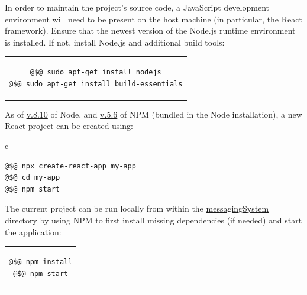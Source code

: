 \documentclass[11pt]{article}
\begin{document}
\noindent In order to maintain the project's source code, a JavaScript development environment will
need to be present on the host machine (in particular, the React framework). Ensure that the
newest version of the Node.js runtime environment is installed. If not, install Node.js and additional
build tools:
\begin{center} \begin{tabular}{c} \begin{lstlisting}[linewidth=7.5cm]
@$@ sudo apt-get install nodejs
@$@ sudo apt-get install build-essentials
\end{lstlisting} \end{tabular} \end{center}
As of \url{v.8.10} of Node, and \url{v.5.6} of NPM (bundled in the Node installation), a new React
project can be created using:
\begin{center} \begin{tabular}{c} \begin{lstlisting}[linewidth=5.5cm]
@$@ npx create-react-app my-app
@$@ cd my-app
@$@ npm start
\end{lstlisting} \end{tabular} \end{center}
The current project can be run locally from within the \url{messagingSystem} directory by using NPM
to first install missing dependencies (if needed) and start the application:
\begin{center} \begin{tabular}{c} \begin{lstlisting}[linewidth=2.5cm]
@$@ npm install
@$@ npm start
\end{lstlisting} \end{tabular} \end{center}
\end{document}
